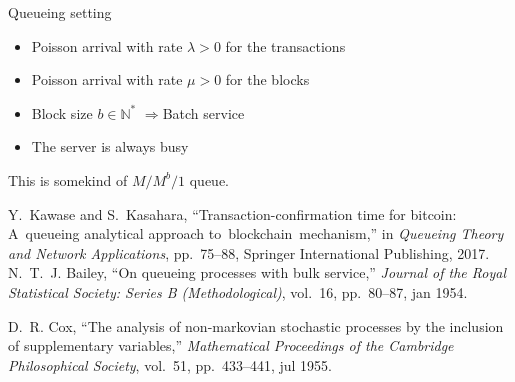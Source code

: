 \documentclass{beamer}
\newcommand*{\warning}{\fontencoding{U}\fontfamily{futs}\selectfont\char 66\relax}
\begin{document}
\begin{frame}{Queueing setting}
\begin{itemize}
\item Poisson arrival with rate $\lambda>0$ for the transactions
\item Poisson arrival with rate $\mu>0$ for the blocks 
\item Block size $b\in\mathbb{N}^\ast$
$\Rightarrow $Batch service
\item[\warning] The server is always busy
\end{itemize}
This is somekind of $M/M^b/1$ queue.
\tiny
\begin{thebibliography}{1}
Y.~Kawase and S.~Kasahara, ``Transaction-confirmation time for bitcoin:
  A~queueing analytical approach to~blockchain~mechanism,'' in {\em Queueing
  Theory and Network Applications}, pp.~75--88, Springer International
  Publishing, 2017.
N.~T.~J. Bailey, ``On queueing processes with bulk service,'' {\em Journal of
  the Royal Statistical Society: Series B (Methodological)}, vol.~16,
  pp.~80--87, jan 1954.

D.~R. Cox, ``The analysis of non-markovian stochastic processes by the
  inclusion of supplementary variables,'' {\em Mathematical Proceedings of the
  Cambridge Philosophical Society}, vol.~51, pp.~433--441, jul 1955.

\end{thebibliography}
\end{frame}
\end{document}
